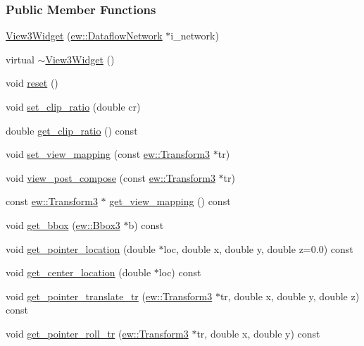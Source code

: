 \subsubsection*{Public Member Functions}
\begin{DoxyCompactItemize}
\item 
\hyperlink{classew_1_1View3Widget_a02c6cc328ca2134102edb1f88fea3ad2}{View3Widget} (\hyperlink{classew_1_1DataflowNetwork}{ew::DataflowNetwork} $\ast$i\_\-network)
\item 
virtual \hyperlink{classew_1_1View3Widget_a83833294148eeb392dc5cbadde2e51f0}{$\sim$View3Widget} ()
\item 
void \hyperlink{classew_1_1View3Widget_afc90fcfe34fb1cdbad10f437e75673a7}{reset} ()
\item 
void \hyperlink{classew_1_1View3Widget_a79673466aa3cb43d392448544853b5e1}{set\_\-clip\_\-ratio} (double cr)
\item 
double \hyperlink{classew_1_1View3Widget_a1b2c3e56f12c09a56e55a1e4f6a5820c}{get\_\-clip\_\-ratio} () const 
\item 
void \hyperlink{classew_1_1View3Widget_aca4dfffefdc6bf300e6f26ef76bb1913}{set\_\-view\_\-mapping} (const \hyperlink{classew_1_1Transform3}{ew::Transform3} $\ast$tr)
\item 
void \hyperlink{classew_1_1View3Widget_a90e7e1db3ccb509999f68e3aa23d27f5}{view\_\-post\_\-compose} (const \hyperlink{classew_1_1Transform3}{ew::Transform3} $\ast$tr)
\item 
const \hyperlink{classew_1_1Transform3}{ew::Transform3} $\ast$ \hyperlink{classew_1_1View3Widget_ac7d97d4e5fe84c860dc9aef539e034f5}{get\_\-view\_\-mapping} () const 
\item 
void \hyperlink{classew_1_1View3Widget_aa7a23dd2ef40661ec6ba2216807983fb}{get\_\-bbox} (\hyperlink{classew_1_1Bbox3}{ew::Bbox3} $\ast$b) const 
\item 
void \hyperlink{classew_1_1View3Widget_aca913dd88a37bd4d614c9f21eef5f3f6}{get\_\-pointer\_\-location} (double $\ast$loc, double x, double y, double z=0.0) const 
\item 
void \hyperlink{classew_1_1View3Widget_aec2e2c037ab83b6ff89f940b0e5a053a}{get\_\-center\_\-location} (double $\ast$loc) const 
\item 
void \hyperlink{classew_1_1View3Widget_a2ee54b43d51423eb3d7eb15aed4d69f4}{get\_\-pointer\_\-translate\_\-tr} (\hyperlink{classew_1_1Transform3}{ew::Transform3} $\ast$tr, double x, double y, double z) const 
\item 
void \hyperlink{classew_1_1View3Widget_ac29f5fc8232cf56db50a06493d31d1ff}{get\_\-pointer\_\-roll\_\-tr} (\hyperlink{classew_1_1Transform3}{ew::Transform3} $\ast$tr, double x, double y) const 

\end{DoxyCompactItemize}
